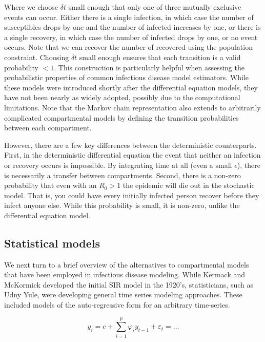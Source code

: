 \documentclass{umassthesis}          %
\begin{document}
Where we choose $\delta t$ small enough that only one of three mutually exclusive events can occur. Either there is a single infection, in which case the number of susceptibles drops by one and the number of infected increases by one, or there is a single recovery, in which case the number of infected drops by one, or no event occurs. Note that we can recover the number of recovered using the population constraint. Choosing $\delta t$ small enough ensures that each transition is a valid probability $<1$. This construction is particularly helpful when assessing the probabilistic properties of common infectious disease model estimators. While these models were introduced shortly after the differential equation models, they have not been nearly as widely adopted, possibly due to the computational limitations. Note that the Markov chain representation also extends to arbitrarily complicated compartmental models by defining the transition probabilities between each compartment. 





However, there are a few key differences between the deterministic counterparts. First, in the deterministic differential equation the event that neither an infection or recovery occurs is impossible. By integrating time at all (even a small $\epsilon$), there is necessarily a transfer between compartments. Second, there is a non-zero probability that even with an $R_0 > 1$ the epidemic will die out in the stochastic model. That is, you could have every initially infected person recover before they infect anyone else. While this probability is small, it is non-zero, unlike the differential equation model. 




\subsection{Statistical models}


We next turn to a brief overview of the alternatives to compartmental models that have been employed in infectious disease modeling. While Kermack and McKormick developed the initial SIR model in the 1920's, statisticians, such as Udny Yule, were developing general time series modeling approaches. These included models of the auto-regressive form for an arbitrary time-series. 

\begin{equation}\label{eq:AR}
y_i = c + \sum_{i=1}^{p}\varphi_i y_{t-1} + \varepsilon_t = \dots
    \end{equation}
\end{document}

